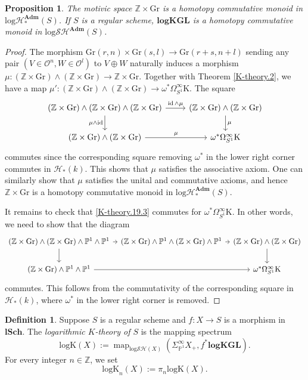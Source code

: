\documentclass[11pt, a4paper]{amsart}
\newtheorem{prop}[thm]{Proposition}
\theoremstyle{definition}
\newtheorem{df}[thm]{Definition}
\numberwithin{equation}{subsection}
\newcommand{\Z}{\mathbb{Z}}
\renewcommand{\P}{\mathbb{P}}
\newcommand{\lSch}{\mathbf{lSch}}
\newcommand{\id}{\operatorname{id}}   			%
\newcommand{\Gr}{{\mathrm{Gr}}}
\newcommand{\Adm}{\mathbf{Adm}}
\newcommand{\Kth}{\mathrm{K}}
\newcommand{\logKGL}{\mathbf{logKGL}}
\newcommand{\Kthlog}{\mathrm{logK}}
\newcommand{\cO}{\mathcal{O}}
\newcommand{\infHpt}{\mathcal{H}_{\ast}}
\newcommand{\inflogHpt}{\mathrm{log}\mathcal{H}_\ast}
\newcommand{\inflogSH}{\mathrm{log}\mathcal{SH}}
\newcommand{\map}{\operatorname{map}}
\begin{document}
\begin{prop}
\label{K-theory.20}
The motivic space $\Z\times \Gr$ is a homotopy commutative monoid in $\inflogHpt^\Adm(S)$. If $S$ is a regular scheme,
 $\logKGL$ is a homotopy commutative monoid in $\inflogSH^\Adm(S)$. 
\end{prop}
\begin{proof}
The morphism $\Gr(r,n)\times \Gr(s,l)\to \Gr(r+s,n+l)$ sending any pair $(V\in \cO^n,W\in \cO^l)$ to $V\oplus W$ naturally induces a morphism $\mu\colon (\Z\times \Gr)\wedge (\Z\times \Gr)\to \Z\times \Gr$.
Together with Theorem \ref{K-theory.2}, we have a map $\mu'\colon (\Z\times \Gr)\wedge (\Z \times \Gr)\to \omega^*\Omega_{S^1}^\infty \Kth$.
The square
\[
\begin{tikzcd}
(\Z\times \Gr)\wedge (\Z\times \Gr)\wedge (\Z\times \Gr)\ar[d,"\mu\wedge \id"']\ar[r,"\id\wedge \mu"]&
(\Z\times \Gr)\wedge (\Z\times \Gr)\ar[d,"\mu"]
\\
(\Z\times \Gr)\wedge (\Z\times \Gr)\ar[r,"\mu"]&
\omega^*\Omega_{S^1}^\infty \Kth
\end{tikzcd}
\]
commutes since the corresponding square removing $\omega^*$ in the lower right corner commutes in $\infHpt(k)$.
This shows that $\mu$ satisfies the associative axiom.
One can similarly show that $\mu$ satisfies the unital and commutative axioms, and hence $\Z\times \Gr$ is a homotopy commutative monoid in $\inflogHpt^\Adm(S)$.

It remains to check that \eqref{K-theory.19.3} commutes for $\omega^*\Omega_{S^1}^\infty \Kth$.
In other words, we need to show that the diagram
\[
\begin{tikzcd}[column sep=tiny]
(\Z\times \Gr)\wedge (\Z\times \Gr)\wedge \P^1\wedge \P^1\ar[r]\ar[d]&
(\Z\times \Gr)\wedge \P^1\wedge (\Z\times \Gr)\wedge \P^1\ar[r]&
(\Z\times \Gr)\wedge (\Z\times \Gr)\ar[d]
\\
(\Z\times \Gr)\wedge \P^1\wedge \P^1\ar[rr]&
&
\omega^*\Omega_{S^1}^\infty \Kth
\end{tikzcd}
\]
commutes.
This follows from the commutativity of the corresponding square in $\infHpt(k)$, where $\omega^*$ in the lower right corner is removed.
\end{proof}

\begin{df}
\label{K-theory.11}
Suppose $S$ is a regular scheme and $f\colon X\to S$ is a morphism in $\lSch$.
The \emph{logarithmic $K$-theory of $S$}  \index[notation]{Klog @ $\Kthlog$} 
is the mapping spectrum
\[
\Kthlog(X):=\map_{\inflogSH(X)}(\Sigma_{\P^1}^\infty X_+,f^*\logKGL).
\]
For every integer $n\in\mathbb{Z}$, we set
\[
\Kthlog_n(X):=\pi_n\Kthlog(X).
\]
\end{df}
\end{document}
